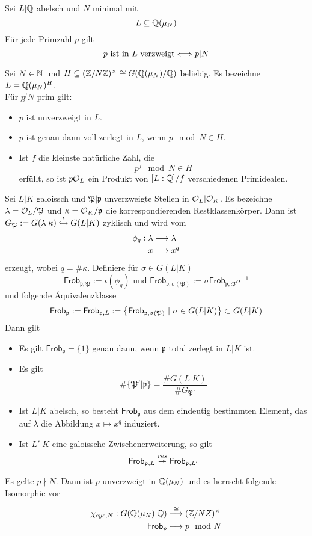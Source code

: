 \documentclass{book}
\renewcommand{\i}{^{-1}}
\newcommand{\pf}{\mathfrak{p}}
\newcommand{\Pf}{\mathfrak{P}}
\newcommand{\Frob}{\textsf{Frob}}
\begin{document}
\Satz{}
Sei $L|\mathbb{Q}$ abelsch und $N$ minimal mit
\[ L \subseteq \mathbb{Q}(\mu_N) \]
Für jede Primzahl $p$ gilt
\[ p \text{ ist in }L \text{ verzweigt} \overset{}{\Longleftrightarrow} p|N \]

\Satz{}
Sei $N \in \mathbb{N}$ und $H \subseteq (\mathbb{Z}/N\mathbb{Z})^\times \overset{}{\cong} G(\mathbb{Q}(\mu_N) / \mathbb{Q})$ beliebig. Es bezeichne $L = \mathbb{Q}(\mu_N)^H$.\\
Für $p\not | N$ prim gilt:
\begin{itemize}
	\item $p$ ist unverzweigt in $L$.
	\item $p$ ist genau dann voll zerlegt in $L$, wenn $p\mod{N} \in H$.
	\item Ist $f$ die kleinste natürliche Zahl, die
	\[ p^f \mod{N} \in H \]
	erfüllt, so ist $p\mathcal{O}_L$ ein Produkt von $[L:\mathbb{Q}]/f$ verschiedenen Primidealen. 
\end{itemize}

\Prop{}
Sei $L|K$ galoissch und $\Pf|\pf$ unverzweigte Stellen in $\mathcal{O}_L|\mathcal{O}_K$. Es bezeichne $\lambda = \O_L / \Pf$ und $\kappa = \O_K /\pf$ die korrespondierenden Restklassenkörper. Dann ist $G_\Pf := G(\lambda | \kappa) \inj{\iota} G(L|K)$ zyklisch und wird vom 
\begin{align*}
\phi_q : \lambda & \overset{}{\longrightarrow} \lambda\\
x &\longmapsto x^q 
\end{align*}
erzeugt, wobei $q = \# \kappa$. Definiere für $\sigma \in G(L|K)$
\[ \Frob_{\pf, \Pf} := \iota(\phi_q) \text{ und } \Frob_{\pf, \sigma(\Pf)} := \sigma \Frob_{\pf, \Pf} \sigma\i \]
und folgende Äquivalenzklasse
\[ \Frob_\pf :=\Frob_{\pf,L} := \set{ \Frob_{\pf, \sigma(\Pf)} }{\sigma \in G(L|K)} \subset G(L|K) \]
Dann gilt
\begin{itemize}
	\item Es gilt $\Frob_\pf = \{1\}$ genau dann, wenn $\pf$ total zerlegt in $L|K$ ist.
	\item Es gilt
	\[ \#\{ \Pf' | \pf \} = \frac{\#G(L|K)}{\#G_{\Pf'}} \]
	\item Ist $L|K$ abelsch, so besteht $\Frob_\pf$ aus dem eindeutig bestimmten Element, das auf $\lambda$ die Abbildung $x \mapsto x^q$ induziert.
	\item Ist $L'|K$ eine galoissche Zwischenerweiterung, so gilt
	\[ \Frob_{\pf, L} \surj{res} \Frob_{\pf,L'} \]
\end{itemize}

\Prop{}
Es gelte $p\nmid N$. Dann ist $p$ unverzweigt in $\mathbb{Q}(\mu_N)$ und es herrscht folgende Isomorphie vor
\begin{align*}
\chi_{cyc, N} : G(\Q(\mu_N) | \Q) & \Pfeil{\isom{}} (\Z/NZ)^\times\\
\Frob_p & \longmapsto p \mod{N}
\end{align*}
\end{document}
